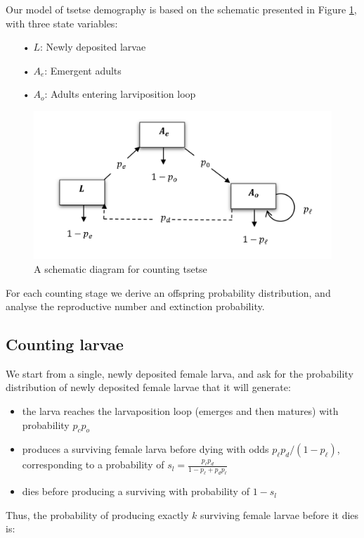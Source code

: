 \documentclass[smallextended]{svjour3}
\begin{document}
Our model of tsetse demography is based on the schematic presented in Figure \ref{fig:flowchart}, with three state variables:

\begin{itemize}
\item[•] $L$: Newly deposited larvae
\item[•] $A_{e}$: Emergent adults
\item[•] $A_{o}$: Adults entering larviposition loop
\end{itemize}
\begin{figure}[hbt!]
	\centering
	\includegraphics[width=0.7\linewidth]{Tsetseflowchart.png}
	\caption{A schematic diagram for counting tsetse}
	\label{fig:flowchart}
\end{figure}

For each counting stage we derive an offspring probability distribution, and analyse the reproductive number and extinction probability.    

\subsection{Counting larvae}

We start from a single, newly deposited female larva, and ask for the probability distribution of newly deposited female larvae that it will generate:

\begin{itemize}
\item the larva reaches the larvaposition loop (emerges and then matures) with probability $p_c p_o$
\item produces a surviving female larva before dying with odds $p_\ell p_d / (1-p_\ell)$, corresponding to a probability of $s_l = \frac{p_\ell p_d}{1 - p_\ell + p_d p_\ell}$
\item dies before producing a surviving with probability of $1-s_l$
\end{itemize} 

Thus, the probability of producing exactly $k$ surviving female larvae before it dies is:
\end{document}
